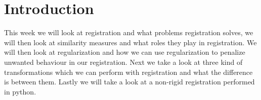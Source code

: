 \section{Introduction}
This week we will look at registration and what problems registration solves, we will then look at similarity measures and what roles they play in registration. We will then look at regularization and how we can use regularization to penalize unwanted behaviour in our registration. Next we take a look at three kind of transformations which we can perform with registration and what the difference is between them. Lastly we will take a look at a non-rigid registration performed in python.